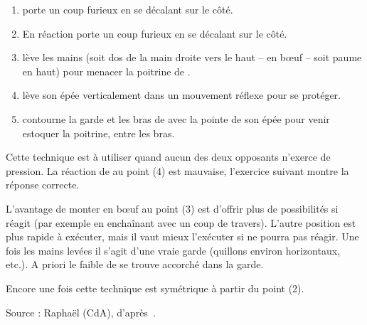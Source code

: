 \begin{exercice}

\begin{enumerate}
	\item \A porte un coup furieux en se décalant sur le côté.
	
	\item En réaction \D porte un coup furieux en se décalant sur le côté.
	
	\item \D lève les mains (soit dos de la main droite vers le haut – en bœuf – soit paume en haut) pour menacer la poitrine de \A.
	
	\item \A lève son épée verticalement dans un mouvement réflexe pour se protéger.
	
	\item \D contourne la garde et les bras de \A avec la pointe de son épée pour venir estoquer la poitrine, entre les bras.
\end{enumerate}

Cette technique est à utiliser quand aucun des deux opposants n'exerce de pression.
La réaction de \A au point (4) est mauvaise, l'exercice suivant montre la réponse correcte.

L'avantage de monter en bœuf au point (3) est d'offrir plus de possibilités si \A réagit (par exemple en enchaînant avec un coup de travers).
L'autre position est plus rapide à exécuter, mais il vaut mieux l'exécuter si \A ne pourra pas réagir.
Une fois les mains levées il s'agit d'une vraie garde (quillons environ horizontaux, etc.).
A priori le faible de \A se trouve accorché dans la garde.

Encore une fois cette technique est symétrique à partir du point (2).

Source : Raphaël (CdA), d'après~\cite{farrell:ringeck}.
\end{exercice}


